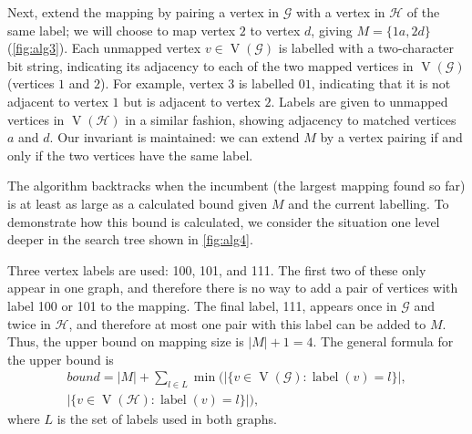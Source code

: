 \documentclass[letterpaper]{article}
\newcommand{\graphG}{\mathcal{G}}
\newcommand{\graphH}{\mathcal{H}}
\DeclareMathOperator{\V}{V}
\DeclareMathOperator{\vtxlabel}{label}
\begin{document}
Next, extend the mapping by pairing a vertex in $\graphG$ with a vertex in $\graphH$ of the
same label; we will choose to map vertex $2$ to vertex $d$, giving $M=\{1a,
2d\}$ (\cref{fig:alg3}).  Each unmapped vertex $v \in \V(\graphG)$ is labelled
with a two-character bit string, indicating its adjacency to each of
the two mapped vertices in $\V(\graphG)$ (vertices $1$ and $2$).  For example, vertex
$3$ is labelled $01$, indicating that it is not adjacent to vertex $1$ but is adjacent
to vertex $2$.  Labels are given to unmapped vertices in $\V(\graphH)$ in a similar fashion,
showing adjacency to matched vertices $a$ and $d$.  Our invariant is
maintained: we can extend $M$ by a vertex pairing if and only if the two
vertices have the same label.

The algorithm backtracks when the incumbent (the largest mapping found so far) is at least as large
as a calculated bound given $M$ and the current labelling. To demonstrate how
this bound is calculated, we consider the situation one level deeper in the
search tree shown in \cref{fig:alg4}.

Three vertex labels are used: 100,
101, and 111.  The first two of these only appear in one graph, and therefore
there is no way to add a pair of vertices with label 100 or 101 to the mapping.
The final label, 111, appears once in $\graphG$ and twice in $\graphH$, and therefore at
most one pair with this label can be added to $M$.  Thus, the upper bound on
mapping size is $|M| + 1 = 4$. The general formula for the upper bound is
\begin{multline*}
    \mathit{bound} = |M| + \sum_{l \in L} \min\big(|\{ v \in \V(\graphG) : \vtxlabel(v)=l\}|, \\[-0.3cm]
        |\{ v \in \V(\graphH) : \vtxlabel(v)=l \}|\big) \text{,}
\end{multline*} where $L$ is the set of labels used in both graphs.

\end{document}
